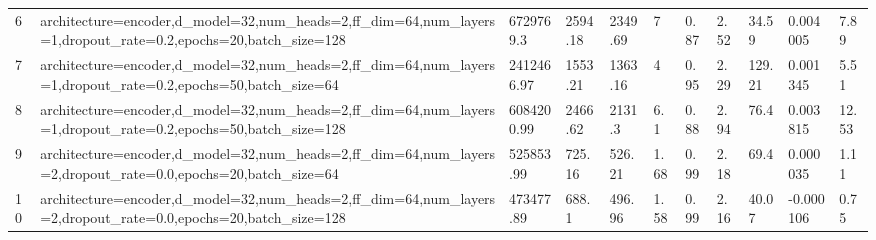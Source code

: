 \begin{longtable}{C{0.8cm} L{2cm} C{1.15cm} C{1.15cm} C{1.15cm} C{1.15cm} C{0.85cm} C{1.25cm} C{1.2cm} C{1.5cm} C{1.0cm}}
6 & architecture=encoder,\newline d\_model=32,\newline num\_heads=2,\newline ff\_dim=64,\newline num\_layers=1,\newline dropout\_rate=0.2,\newline epochs=20,\newline batch\_size=128 & 6729769.3 & 2594.18 & 2349.69 & 7 & 0.87 & 2.52 & 34.59 & 0.004005 & 7.89 \\
7 & architecture=encoder,\newline d\_model=32,\newline num\_heads=2,\newline ff\_dim=64,\newline num\_layers=1,\newline dropout\_rate=0.2,\newline epochs=50,\newline batch\_size=64 & 2412466.97 & 1553.21 & 1363.16 & 4 & 0.95 & 2.29 & 129.21 & 0.001345 & 5.51 \\
8 & architecture=encoder,\newline d\_model=32,\newline num\_heads=2,\newline ff\_dim=64,\newline num\_layers=1,\newline dropout\_rate=0.2,\newline epochs=50,\newline batch\_size=128 & 6084200.99 & 2466.62 & 2131.3 & 6.1 & 0.88 & 2.94 & 76.4 & 0.003815 & 12.53 \\
9 & architecture=encoder,\newline d\_model=32,\newline num\_heads=2,\newline ff\_dim=64,\newline num\_layers=2,\newline dropout\_rate=0.0,\newline epochs=20,\newline batch\_size=64 & 525853.99 & 725.16 & 526.21 & 1.68 & 0.99 & 2.18 & 69.4 & 0.000035 & 1.11 \\
10 & architecture=encoder,\newline d\_model=32,\newline num\_heads=2,\newline ff\_dim=64,\newline num\_layers=2,\newline dropout\_rate=0.0,\newline epochs=20,\newline batch\_size=128 & 473477.89 & 688.1 & 496.96 & 1.58 & 0.99 & 2.16 & 40.07 & -0.000106 & 0.75 \\

\end{longtable}
